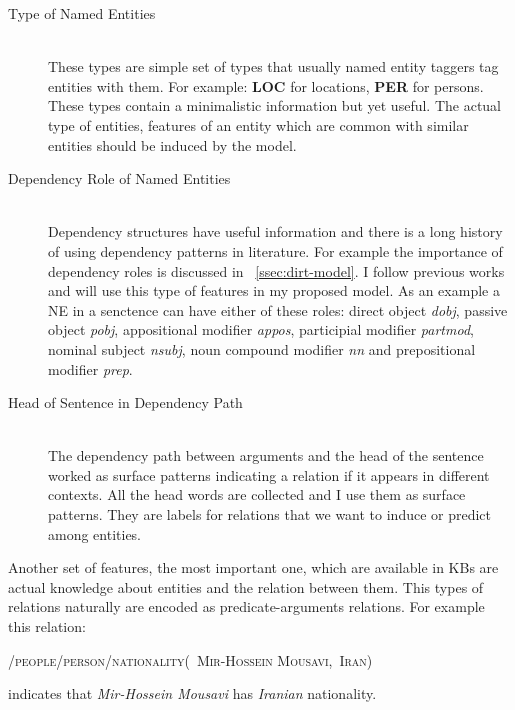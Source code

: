 \begin{description}
  
  \item[Type of Named Entities] \hfill \\
    These types are simple set of types that usually named entity taggers tag
    entities with them. For example: \textbf{LOC} for locations, \textbf{PER}
    for persons. These types contain a minimalistic information but yet useful.
    The actual type of entities, features of an entity which are common with
    similar entities should be induced by the model.
    
  \item[Dependency Role of Named Entities] \hfill \\
    Dependency structures have useful information and there is a long history of
    using dependency patterns in literature. For example the
    importance of dependency roles is discussed in ~\autoref{ssec:dirt-model}.
     I follow previous works and will use this
    type of features in my proposed model. As an example a NE in a senctence can
    have either of these roles: direct object \textit{dobj}, passive object
    \textit{pobj}, appositional modifier \textit{appos}, participial modifier
    \textit{partmod}, nominal subject \textit{nsubj}, noun compound modifier
    \textit{nn} and prepositional modifier \textit{prep}.
 
  \item[Head of Sentence in Dependency Path] \hfill \\
  
  The dependency path between arguments and the head of the sentence worked as
  surface patterns indicating a relation if it appears in different contexts.
  All the head words are collected and I use them as surface patterns. They are
 labels for relations that we want to induce or predict among entities. 
  
  
 \end{description}
 
 Another set of features, the most important one, which are available in KBs are
 actual knowledge about entities and the relation between them. This types of
 relations naturally are encoded as predicate-arguments relations. For example
 this relation:
\begin{center}
\label{rel:mir}
\textsc{ /people/person/nationality(~Mir-Hossein Mousavi,~Iran)}
\hfill
\end{center}

indicates that \textit{Mir-Hossein Mousavi} has \textit{Iranian} nationality.


